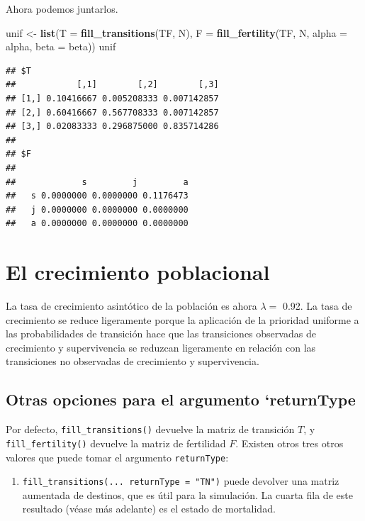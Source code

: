 \documentclass[
]{book}
\newenvironment{Shaded}{\begin{snugshade}}{\end{snugshade}}
\newcommand{\AttributeTok}[1]{\textcolor[rgb]{0.13,0.29,0.53}{#1}}
\newcommand{\FunctionTok}[1]{\textcolor[rgb]{0.13,0.29,0.53}{\textbf{#1}}}
\newcommand{\NormalTok}[1]{#1}
\newcommand{\OtherTok}[1]{\textcolor[rgb]{0.56,0.35,0.01}{#1}}
\providecommand{\tightlist}{%
  \setlength{\itemsep}{0pt}\setlength{\parskip}{0pt}}
\theoremstyle{definition}
\theoremstyle{definition}
\theoremstyle{definition}
\theoremstyle{definition}
\theoremstyle{remark}
\begin{document}
Ahora podemos juntarlos.

\begin{Shaded}
\begin{Highlighting}[]
\NormalTok{unif }\OtherTok{\textless{}{-}} \FunctionTok{list}\NormalTok{(}\AttributeTok{T =} \FunctionTok{fill\_transitions}\NormalTok{(TF, N), }
             \AttributeTok{F =} \FunctionTok{fill\_fertility}\NormalTok{(TF, N, }
                                \AttributeTok{alpha =}\NormalTok{ alpha,}
                                \AttributeTok{beta =}\NormalTok{ beta))}
\NormalTok{unif}
\end{Highlighting}
\end{Shaded}

\begin{verbatim}
## $T
##            [,1]        [,2]        [,3]
## [1,] 0.10416667 0.005208333 0.007142857
## [2,] 0.60416667 0.567708333 0.007142857
## [3,] 0.02083333 0.296875000 0.835714286
## 
## $F
##    
##             s         j         a
##   s 0.0000000 0.0000000 0.1176473
##   j 0.0000000 0.0000000 0.0000000
##   a 0.0000000 0.0000000 0.0000000
\end{verbatim}

\section{El crecimiento poblacional}\label{el-crecimiento-poblacional}

La tasa de crecimiento asintótico de la población es ahora \(\lambda =\)
0.92. La tasa de crecimiento
se reduce ligeramente porque la aplicación de la prioridad uniforme a
las probabilidades de transición hace que las transiciones observadas de
crecimiento y supervivencia se reduzcan ligeramente en relación con las
transiciones no observadas de crecimiento y supervivencia.

\subsection{Otras opciones para el argumento `returnType}\label{otras-opciones-para-el-argumento-returntype}

Por defecto, \texttt{fill\_transitions()} devuelve la matriz de transición \(T\),
y \texttt{fill\_fertility()} devuelve la matriz de fertilidad \(F\). Existen otros
tres otros valores que puede tomar el argumento \texttt{returnType}:

\begin{enumerate}
\def\labelenumi{\arabic{enumi}.}
\tightlist
\item
  \texttt{fill\_transitions(...\ returnType\ =\ "TN")} puede devolver una matriz
  aumentada de destinos, que es útil para la simulación. La cuarta
  fila de este resultado (véase más adelante) es el estado de
  mortalidad.
\end{enumerate}
\end{document}
